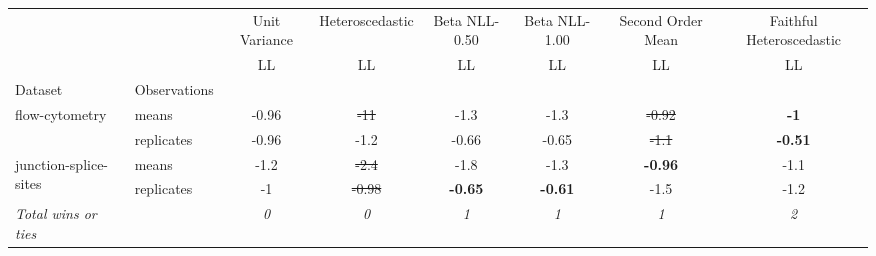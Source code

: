 \begin{tabular}{ll|c|c|c|c|c|c}
\toprule
{} & {} & {Unit Variance} & {Heteroscedastic} & {Beta NLL-0.50} & {Beta NLL-1.00} & {Second Order Mean} & {Faithful Heteroscedastic} \\
{} & {} & {LL} & {LL} & {LL} & {LL} & {LL} & {LL} \\
{Dataset} & {Observations} & {} & {} & {} & {} & {} & {} \\
\midrule
\multirow[t]{2}{*}{flow-cytometry} & means & -0.96 & \sout{-11} & -1.3 & -1.3 & \sout{-0.92} & \textbf{-1} \\
 & replicates & -0.96 & -1.2 & -0.66 & -0.65 & \sout{-1.1} & \textbf{-0.51} \\
\multirow[t]{2}{*}{junction-splice-sites} & means & -1.2 & \sout{-2.4} & -1.8 & -1.3 & \textbf{-0.96} & -1.1 \\
 & replicates & -1 & \sout{-0.98} & \textbf{-0.65} & \textbf{-0.61} & -1.5 & -1.2 \\
\textit{{Total wins or ties}} &  & \textit{0} & \textit{0} & \textit{1} & \textit{1} & \textit{1} & \textit{2} \\
\bottomrule
\end{tabular}
